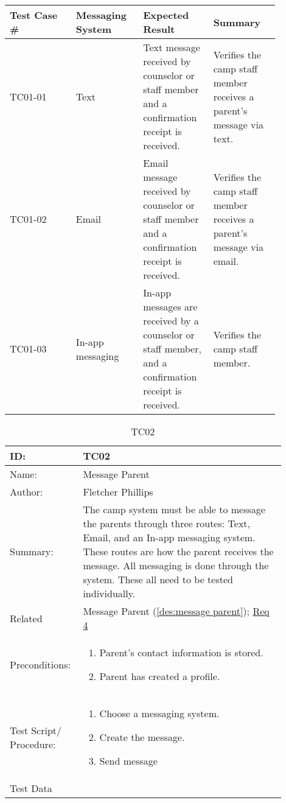 \documentclass[11pt]{article}
\begin{document}
\begin{center}
\begin{longtable}{|p{0.22\linewidth}|p{0.22\linewidth}|p{0.22\linewidth}|p{0.22\linewidth}|}
	\hline 
	Test Case \# & Messaging System & Expected Result & Summary\\\hline
	TC01-01 & Text & Text message received by counselor or staff member and a confirmation receipt is received. & Verifies the camp staff member receives a parent's message via text.\vspace*{1em}\\\hline
	TC01-02 & Email & Email message received by counselor or staff member and a confirmation receipt is received. & Verifies the camp staff member receives a parent's message via email.\vspace*{1em}\\	\hline
	TC01-03 & In-app messaging & In-app messages are received by a counselor or staff member, and a confirmation receipt is received. & Verifies the camp staff member.\vspace*{1em}\\\hline
\end{longtable}
\end{center}
\clearpage


\begin{table}[H]
\begin{center}
\caption{TC02}
\label{TC02}
\begin{tabular}{p{0.20\linewidth}p{0.70\linewidth}}
	ID: & TC02\\\hline
	Name: & Message Parent \\\hline
	Author: & Fletcher Phillips\\\hline
	Summary: &  The camp system must be able to message the parents through three routes: Text, Email, and an In-app messaging system. These routes are how the parent receives the message. All messaging is done through the system. These all need to be tested individually.\\\hline
	Related \hspace{5em} & Message Parent (\cref{des:message parent}); \hyperlink{Req4}{Req 4} \\\hline
	Preconditions:& \begin{enumerate}[topsep=0pt] 
		\item Parent's contact information is stored.
		\item Parent has created a profile.
	\end{enumerate}\\\hline
	Test Script/ Procedure: & \begin{enumerate}[topsep=0pt]
		\item Choose a messaging system.
		\item Create the message.
		\item Send message
	\end{enumerate}\\\hline
	Test Data &
\end{tabular}
\end{center}
\end{table}
\end{document}
